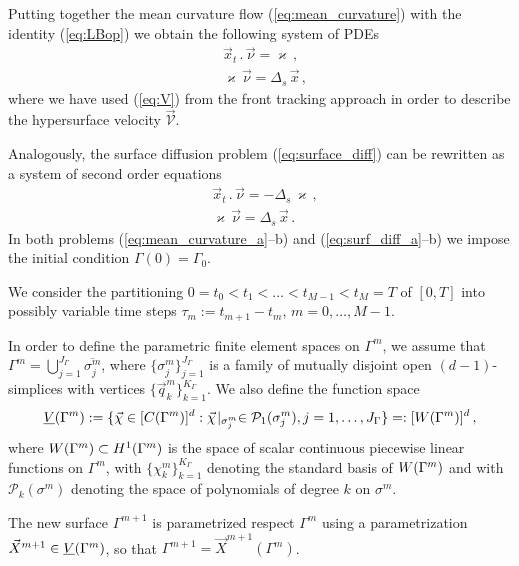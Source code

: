 Putting together the mean curvature flow (\ref{eq:mean_curvature}) with the
identity (\ref{eq:LBop}) we obtain the following system of PDEs
\begin{subequations}
\begin{align}
&\vec{x}_t\,.\,\vec{\nu}=\varkappa\,,\label{eq:mean_curvature_a}\\
&\varkappa\,\vec{\nu}=\Delta_s\,\vec{x}\,,\label{eq:mean_curvature_b}
\end{align}
\end{subequations}
where we have used (\ref{eq:V}) from the front tracking approach in order to
describe the hypersurface velocity $\vec{\mathcal{V}}$.

Analogously, the surface diffusion problem (\ref{eq:surface_diff}) can be
rewritten as a system of second order equations
\begin{subequations}
\begin{align}
&\vec{x}_t\,.\,\vec{\nu}=-\Delta_s\,\varkappa\,,\label{eq:surf_diff_a}\\
&\varkappa\,\vec{\nu}=\Delta_s\,\vec{x}\,.\label{eq:surf_diff_b}
\end{align}
\end{subequations}
In both problems (\ref{eq:mean_curvature_a}--b) and (\ref{eq:surf_diff_a}--b)
we impose the initial condition $\Gamma(0)=\Gamma_0$.

We consider the partitioning  $0= t_0 < t_1 < \ldots < t_{M-1} < t_M = T$ of
$[0,T]$ into possibly variable time steps
$\tau_m := t_{m+1}-t_m$, $m=0,\ldots, M-1$.

In order to define the parametric finite element spaces on $\Gamma^m$, we
assume that $\Gamma^m=\bigcup_{j=1}^{J_\Gamma} \overline{\sigma^m_j}$, where
$\{\sigma^m_j\}_{j=1}^{J_\Gamma}$ is a family of mutually disjoint open
$(d-1)$-simplices with vertices $\{\vec{q}^m_k\}_{k=1}^{K_\Gamma}$. We also
define the function space
\begin{equation}
\underline{V}(\Gamma^m) := \{\vec\chi \in [C(\Gamma^m)]^d:\vec\chi\!\mid_{\sigma^m_j}
\in \mathcal{P}_1(\sigma^m_j), j=1,\ldots, J_\Gamma\} =: [W(\Gamma^m)]^d\,,
\end{equation}
where $W(\Gamma^m) \subset H^1(\Gamma^m)$ is the space of scalar continuous
piecewise linear functions on $\Gamma^m$, with $\{\chi^m_k\}_{k=1}^{K_\Gamma}$
denoting the standard basis of $W(\Gamma^m)$ and with $\mathcal{P}_k(\sigma^m)$
denoting the space of polynomials of degree $k$ on $\sigma^m$.

The new surface $\Gamma^{m+1}$ is parametrized respect $\Gamma^m$ using a
parametrization $\vec{X}^{m+1} \in \underline{V}(\Gamma^m)$, so that $\Gamma^{m+1} =
\vec{X}^{m+1}(\Gamma^m)$.

